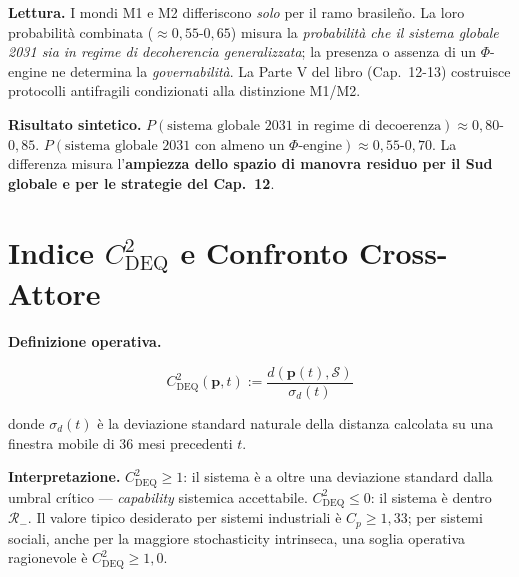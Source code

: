 \Hypoth{} \textbf{Lettura.} I mondi M1 e M2 differiscono \emph{solo} per
il ramo brasileño. La loro probabilità combinata
(\(\approx 0{,}55\)-\(0{,}65\)) misura la \emph{probabilità che il
sistema globale 2031 sia in regime di decoherencia generalizzata}; la
presenza o assenza di un \(\Phi\)-engine ne determina la
\emph{governabilità}. La Parte V del libro (Cap.~12-13) costruisce
protocolli antifragili condizionati alla distinzione M1/M2.

\Proved{} \textbf{Risultato sintetico.}
\(P(\text{sistema globale 2031 in regime di decoerenza}) \approx 0{,}80\)-\(0{,}85\).
\(P(\text{sistema globale 2031 con almeno un $\Phi$-engine}) \approx 0{,}55\)-\(0{,}70\).
La differenza misura l'\textbf{ampiezza dello spazio di manovra residuo
per il Sud globale e per le strategie del Cap.~12}.



\section{\texorpdfstring{Indice \(C_{\text{DEQ}}^2\) e Confronto
Cross-Attore}{Indice C\_\{\textbackslash text\{DEQ\}\}\^{}2 e Confronto Cross-Attore}}\label{indice-c_textdeq2-e-confronto-cross-attore}

\Hypoth{} \textbf{Definizione operativa.}

\[
C_{\text{DEQ}}^2(\boldsymbol{p}, t) := \frac{d(\boldsymbol{p}(t), \mathcal{S})}{\sigma_d(t)}
\]

donde \(\sigma_d(t)\) è la deviazione standard naturale della distanza
calcolata su una finestra mobile di 36 mesi precedenti \(t\).

\Proved{} \textbf{Interpretazione.} \(C_{\text{DEQ}}^2 \geq 1\): il
sistema è a oltre una deviazione standard dalla umbral crítico ---
\emph{capability} sistemica accettabile. \(C_{\text{DEQ}}^2 \leq 0\): il
sistema è dentro \(\mathcal{R}_-\). Il valore tipico desiderato per
sistemi industriali è \(C_p \geq 1{,}33\); per sistemi sociali, anche
per la maggiore stochasticity intrinseca, una soglia operativa
ragionevole è \(C_{\text{DEQ}}^2 \geq 1{,}0\).

